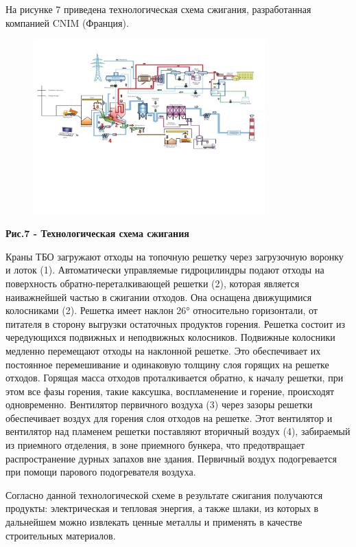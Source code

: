 На рисунке 7 приведена технологическая схема сжигания, разработанная
компанией CNIM (Франция).


\begin{figure}[H]
	\centering
	\includegraphics[width=0.8\textwidth]{media/chem2/image70}
	\caption*{}
\end{figure}


{\bfseries Рис.7 - Технологическая схема сжигания}

Краны ТБО загружают отходы на топочную решетку через загрузочную воронку
и лоток (1). Автоматически управляемые гидроцилиндры подают отходы на
поверхность обратно-переталкивающей решетки (2), которая является
наиважнейшей частью в сжигании отходов. Она оснащена движущимися
колосниками (2). Решетка имеет наклон 26° относительно горизонтали, от
питателя в сторону выгрузки остаточных продуктов горения. Решетка
состоит из чередующихся подвижных и неподвижных колосников. Подвижные
колосники медленно перемещают отходы на наклонной решетке. Это
обеспечивает их постоянное перемешивание и одинаковую толщину слоя
горящих на решетке отходов. Горящая масса отходов проталкивается
обратно, к началу решетки, при этом все фазы горения, такие каксушка,
воспламенение и горение, происходят одновременно. Вентилятор первичного
воздуха (3) через зазоры решетки обеспечивает воздух для горения слоя
отходов на решетке. Этот вентилятор и вентилятор над пламенем решетки
поставляют вторичный воздух (4), забираемый из приемного отделения, в
зоне приемного бункера, что предотвращает распространение дурных запахов
вне здания. Первичный воздух подогревается при помощи парового
подогревателя воздуха.

Согласно данной технологической схеме в результате сжигания получаются
продукты: электрическая и тепловая энергия, а также шлаки, из которых в
дальнейшем можно извлекать ценные металлы и применять в качестве
строительных материалов.

